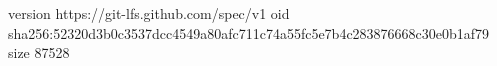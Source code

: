 version https://git-lfs.github.com/spec/v1
oid sha256:52320d3b0c3537dcc4549a80afc711c74a55fc5e7b4c283876668c30e0b1af79
size 87528
